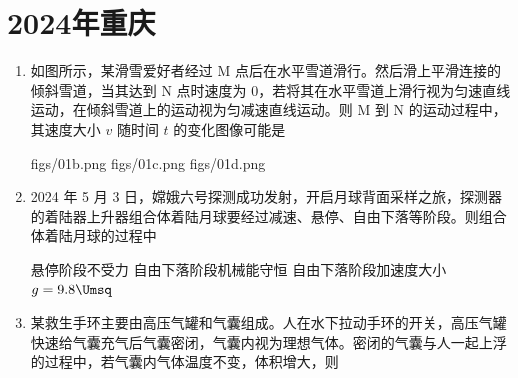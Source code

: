\documentclass[\gkver]{gaokaozhenti}
\begin{document}
\chapter{2024年重庆}

\begin{enumerate}
\item
如图所示，某滑雪爱好者经过 M 点后在水平雪道滑行。然后滑上平滑连接的倾斜雪道，当其达到 N 点时速度为 0，若将其在水平雪道上滑行视为匀速直线运动，在倾斜雪道上的运动视为匀减速直线运动。则 M 到 N 的运动过程中，其速度大小 $v$ 随时间 $t$ 的变化图像可能是


{figs/01b.png}
{figs/01c.png}
{figs/01d.png}


\item
2024 年 5 月 3 日，嫦娥六号探测成功发射，开启月球背面采样之旅，探测器的着陆器上升器组合体着陆月球要经过减速、悬停、自由下落等阶段。则组合体着陆月球的过程中

{悬停阶段不受力}
{自由下落阶段机械能守恒}
{自由下落阶段加速度大小 $g = 9.8 \Umsq$}


\item
某救生手环主要由高压气罐和气囊组成。人在水下拉动手环的开关，高压气罐快速给气囊充气后气囊密闭，气囊内视为理想气体。密闭的气囊与人一起上浮的过程中，若气囊内气体温度不变，体积增大，则


\end{enumerate}
\end{document}
